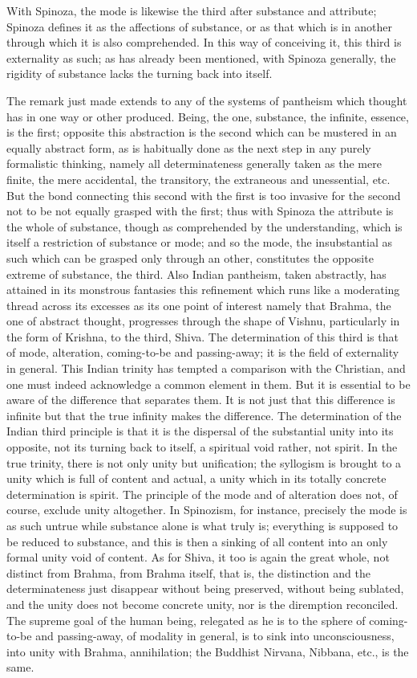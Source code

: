 With Spinoza, the mode is likewise
the third after substance and attribute;
Spinoza defines it as the affections of substance,
or as that which is in another through which it is also comprehended.
In this way of conceiving it, this third is externality as such;
as has already been mentioned, with Spinoza generally,
the rigidity of substance lacks the turning back into itself.

The remark just made extends to any of the systems of pantheism
which thought has in one way or other produced.
Being, the one, substance, the infinite, essence, is the first;
opposite this abstraction is the second which
can be mustered in an equally abstract form,
as is habitually done as the next step in any purely formalistic thinking,
namely all determinateness generally taken as the mere finite,
the mere accidental, the transitory, the extraneous and unessential, etc.
But the bond connecting this second with the first is too invasive
for the second not to be not equally grasped with the first;
thus with Spinoza the attribute is the whole of substance,
though as comprehended by the understanding,
which is itself a restriction of substance or mode;
and so the mode, the insubstantial as such which can
be grasped only through an other,
constitutes the opposite extreme of substance, the third.
Also Indian pantheism, taken abstractly, has attained
in its monstrous fantasies this refinement
which runs like a moderating thread across its excesses
as its one point of interest namely
that Brahma, the one of abstract thought,
progresses through the shape of Vishnu,
particularly in the form of Krishna, to the third, Shiva.
The determination of this third is that of mode, alteration,
coming-to-be and passing-away;
it is the field of externality in general.
This Indian trinity has tempted a comparison with the Christian,
and one must indeed acknowledge a common element in them.
But it is essential to be aware of the difference that separates them.
It is not just that this difference is infinite
but that the true infinity makes the difference.
The determination of the Indian third principle is that
it is the dispersal of the substantial unity into its opposite,
not its turning back to itself,
a spiritual void rather, not spirit.
In the true trinity, there is not only unity but unification;
the syllogism is brought to a unity which is full of content and actual,
a unity which in its totally concrete determination is spirit.
The principle of the mode and of alteration
does not, of course, exclude unity altogether.
In Spinozism, for instance, precisely the mode is as such untrue
while substance alone is what truly is;
everything is supposed to be reduced to substance,
and this is then a sinking of all content into
an only formal unity void of content.
As for Shiva, it too is again the great whole,
not distinct from Brahma, from Brahma itself, that is,
the distinction and the determinateness just disappear
without being preserved, without being sublated,
and the unity does not become concrete unity,
nor is the diremption reconciled.
The supreme goal of the human being,
relegated as he is to the sphere
of coming-to-be and passing-away,
of modality in general,
is to sink into unconsciousness,
into unity with Brahma, annihilation;
the Buddhist Nirvana, Nibbana, etc., is the same.

